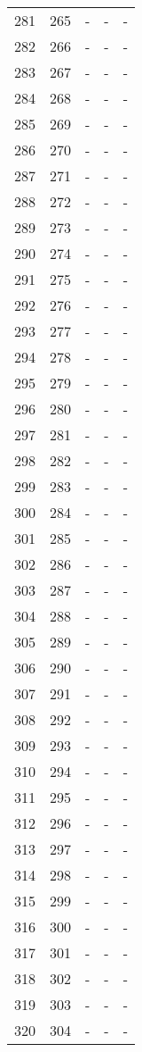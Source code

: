 \documentclass[10pt]{article}
\begin{document}
\begin {longtable}{l r r r r}
281 & 265 & - & - & - \\
282 & 266 & - & - & - \\
283 & 267 & - & - & - \\
284 & 268 & - & - & - \\
285 & 269 & - & - & - \\
286 & 270 & - & - & - \\
287 & 271 & - & - & - \\
288 & 272 & - & - & - \\
289 & 273 & - & - & - \\
290 & 274 & - & - & - \\
291 & 275 & - & - & - \\
292 & 276 & - & - & - \\
293 & 277 & - & - & - \\
294 & 278 & - & - & - \\
295 & 279 & - & - & - \\
296 & 280 & - & - & - \\
297 & 281 & - & - & - \\
298 & 282 & - & - & - \\
299 & 283 & - & - & - \\
300 & 284 & - & - & - \\
301 & 285 & - & - & - \\
302 & 286 & - & - & - \\
303 & 287 & - & - & - \\
304 & 288 & - & - & - \\
305 & 289 & - & - & - \\
306 & 290 & - & - & - \\
307 & 291 & - & - & - \\
308 & 292 & - & - & - \\
309 & 293 & - & - & - \\
310 & 294 & - & - & - \\
311 & 295 & - & - & - \\
312 & 296 & - & - & - \\
313 & 297 & - & - & - \\
314 & 298 & - & - & - \\
315 & 299 & - & - & - \\
316 & 300 & - & - & - \\
317 & 301 & - & - & - \\
318 & 302 & - & - & - \\
319 & 303 & - & - & - \\
320 & 304 & - & - & - \\

\end{longtable}
\end{document}
